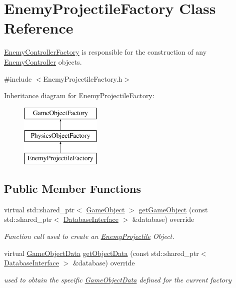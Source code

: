 \hypertarget{class_enemy_projectile_factory}{}\section{Enemy\+Projectile\+Factory Class Reference}
\label{class_enemy_projectile_factory}


\hyperlink{class_enemy_controller_factory}{Enemy\+Controller\+Factory} is responsible for the construction of any \hyperlink{class_enemy_controller}{Enemy\+Controller} objects.  




{\ttfamily \#include $<$Enemy\+Projectile\+Factory.\+h$>$}

Inheritance diagram for Enemy\+Projectile\+Factory\+:\begin{figure}[H]
\begin{center}
\leavevmode
\includegraphics[height=3.000000cm]{d2/db0/class_enemy_projectile_factory}
\end{center}
\end{figure}
\subsection*{Public Member Functions}
\begin{DoxyCompactItemize}
\item 
virtual std\+::shared\+\_\+ptr$<$ \hyperlink{class_game_object}{Game\+Object} $>$ \hyperlink{class_enemy_projectile_factory_a081c6bea7032956c278fdf4ff62d530a}{get\+Game\+Object} (const std\+::shared\+\_\+ptr$<$ \hyperlink{class_database_interface}{Database\+Interface} $>$ \&database) override
\begin{DoxyCompactList}\small\item\em Function call used to create an \hyperlink{class_enemy_projectile}{Enemy\+Projectile} Object. \end{DoxyCompactList}\item 
virtual \hyperlink{struct_game_object_data}{Game\+Object\+Data} \hyperlink{class_enemy_projectile_factory_a1ef660e5962f29b7353054c6480477c7}{get\+Object\+Data} (const std\+::shared\+\_\+ptr$<$ \hyperlink{class_database_interface}{Database\+Interface} $>$ \&database) override
\begin{DoxyCompactList}\small\item\em used to obtain the specific \hyperlink{struct_game_object_data}{Game\+Object\+Data} defined for the current factory \end{DoxyCompactList}\end{DoxyCompactItemize}


